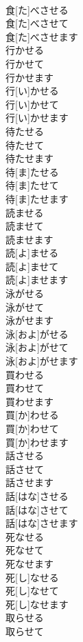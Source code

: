 \documentclass[8pt]{extreport}
\begin{document}
\begin{CJK}{UTF8}{min}
\\	食[た]べさせる 
\\	食[た]べさせて 
\\	食[た]べさせます
\\	行かせる 
\\	行かせて 
\\	行かせます	
\\	行[い]かせる 
\\	行[い]かせて 
\\	行[い]かせます
\\	待たせる 
\\	待たせて 
\\	待たせます	
\\	待[ま]たせる 
\\	待[ま]たせて 
\\	待[ま]たせます	
\\	読ませる 
\\	読ませて 
\\	読ませます	
\\	読[よ]ませる 
\\	読[よ]ませて 
\\	読[よ]ませます
\\	泳がせる 
\\	泳がせて 
\\	泳がせます	
\\	泳[およ]がせる 
\\	泳[およ]がせて 
\\	泳[およ]がせます
\\	買わせる 
\\	買わせて 
\\	買わせます	
\\	買[か]わせる 
\\	買[か]わせて 
\\	買[か]わせます
\\	話させる 
\\	話させて 
\\	話させます	
\\	話[はな]させる 
\\	話[はな]させて 
\\	話[はな]させます
\\	死なせる 
\\	死なせて 
\\	死なせます	
\\	死[し]なせる 
\\	死[し]なせて 
\\	死[し]なせます
\\	取らせる 
\\	取らせて 

\end{CJK}
\end{document}
